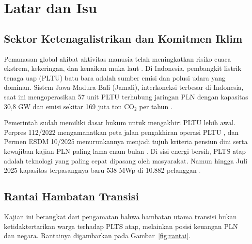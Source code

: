 \section{Latar dan Isu}
\label{sec:latar}

\subsection{Sektor Ketenagalistrikan dan Komitmen Iklim}

Pemanasan global akibat aktivitas manusia telah meningkatkan risiko cuaca ekstrem, kekeringan, dan kenaikan muka laut \parencite{P-IPCC-2023}. Di Indonesia, pembangkit listrik tenaga uap (PLTU) batu bara adalah sumber emisi dan polusi udara yang dominan. Sistem Jawa-Madura-Bali (Jamali), interkoneksi terbesar di Indonesia, saat ini mengoperasikan 57 unit PLTU terhubung jaringan PLN dengan kapasitas 30,8 GW dan emisi sekitar 169 juta ton CO$_2$ per tahun \parencite{D-GEM-GCPT}.

Pemerintah sudah memiliki dasar hukum untuk mengakhiri PLTU lebih awal. Perpres 112/2022 mengamanatkan peta jalan pengakhiran operasi PLTU \parencite{R-PERPRES-112-2022}, dan Permen ESDM 10/2025 menurunkannya menjadi tujuh kriteria pensiun dini serta kewajiban kajian PLN paling lama enam bulan \parencite{R-PERMEN-ESDM-10-2025,B-CNN-20250422}. Di sisi energi bersih, PLTS atap adalah teknologi yang paling cepat dipasang oleh masyarakat. Namun hingga Juli 2025 kapasitas terpasangnya baru 538 MWp di 10.882 pelanggan \parencite{B-KONTAN-ROOFTOP-2025}.

\subsection{Rantai Hambatan Transisi}

Kajian ini berangkat dari pengamatan bahwa hambatan utama transisi bukan ketidaktertarikan warga terhadap PLTS atap, melainkan posisi keuangan PLN dan negara. Rantainya digambarkan pada Gambar~\ref{fig:rantai}.

